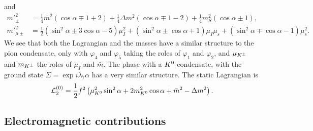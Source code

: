 \endgroup
%
and
%
\begingroup
\allowdisplaybreaks
\begin{align}
    {m'}_\pm^2
    & =
    \frac{1}{4}\bar m^2 (\cos\alpha \mp 1 + 2)
    + \frac{1}{4} \Delta m^2 (\cos\alpha \mp 1-2)
    +\frac{1}{4} m_S^2 (\cos\alpha \pm 1), \\
    {m'}_{\mu\pm}^2
    & =
    \frac{1}{2}(\sin^2\alpha  \pm 3\cos\alpha - 5)\mu_I^2
    +(\sin^2\alpha\pm\cos\alpha + 1)\mu_I\mu_s
    +(\sin^2\alpha\mp\cos\alpha - 1)\mu_s^2.
\end{align}
\endgroup
%
We see that both the Lagrangian and the masses have a similar structure to the pion condensate, only with $\varphi_4$ and $\varphi_5$ taking the roles of $\varphi_1$ and $\varphi_2$, and $\mu_{K^\pm}$ and $m_{K^\pm}$ the roles of $\mu_I$ and $\bar m$.
The phase with a ${K^0}$-condensate, with the ground state $\Sigma = \exp{i \lambda_7 \alpha}$ has a very similar structure.
The static Lagrangian is
%
\begin{equation}
    \label{static Lagrangian neutral kaon}
    \mathcal{L}_2^{(0)} = \frac{1}{2}f^2 
    \left(
        \mu_{K^0}^2 \sin^2\alpha
        + 2m_{K^0}^2\cos\alpha + \bar m^2 - \Delta m^2
    \right).
\end{equation}
%


 
\subsection{Electromagnetic contributions}

